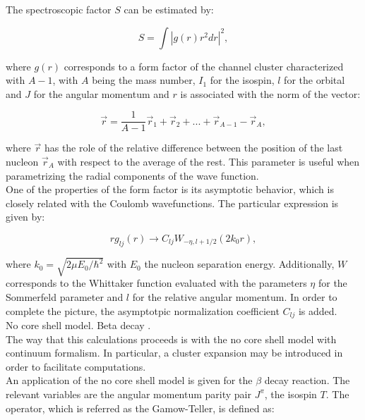 \documentclass[openany]{book}
\begin{document}
The spectroscopic factor $S$ can be estimated by: 

\begin{equation}\label{eq:micro_NCSH_application_S}
	S = \int { \left| g (r)  r^2 dr \right|^2},
\end{equation}

where $g(r)$ corresponds to a form factor of the channel cluster characterized with $A - 1$, with $A$ being the mass number, $I_1$ for the isospin, $l$ for the orbital and $J$ for the angular momentum and $r$ is associated with the norm of the vector: 

\begin{equation}\label{eq:micro_NCSH_application_r}
	\vec r  = \frac{1} {A - 1} \vec r_1 + \vec r_2 + ... + \vec r_{A-1} - \vec r_A,
\end{equation}

where $\vec r$ has the role of the relative difference between the position of the last nucleon $\vec r_A$ with respect to the average of the rest. This parameter is useful when parametrizing the radial components of the wave function. \\

One of the properties of the form factor is its asymptotic behavior, which is closely related with the Coulomb wavefunctions. The particular expression is given by: 

\begin{equation}\label{eq:micro_NCSH_application_asymptotics}
	r g_{lj}(r) \rightarrow C_{lj} W_{-\eta , l + 1/2} (2k_0r), 
\end{equation}

where $k_0 = \sqrt{2\mu E_0/\hbar^2}$ with $E_0$ the nucleon separation energy. Additionally, $W$ corresponds to the Whittaker function evaluated with the parameters $\eta$ for the Sommerfeld parameter and $l$ for the relative angular momentum. In order to complete the picture, the asymptotpic normalization coefficient $C_{lj}$ is added.  \\

No core shell model. Beta decay \cite{atkinson_navratil_hupin_kravvaris_quaglioni_2022}. \\

The way that this calculations proceeds is with the no core shell model with continuum formalism. In particular, a cluster expansion may be introduced in order to facilitate computations. \\

An application of the no core shell model is given for the $\beta$ decay reaction. The relevant variables are the angular momentum parity pair $J^\pi$, the isospin $T$. The operator, which is referred as the Gamow-Teller, is defined as: 
\end{document}
